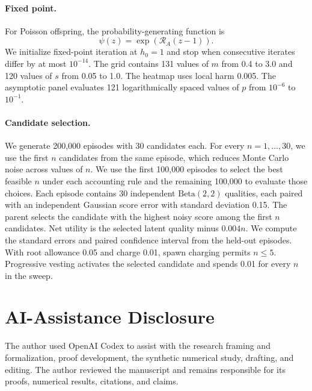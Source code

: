 \documentclass[sigconf,nonacm]{acmart}
\newcommand{\RA}{\mathcal{R}_{\!A}}
\begin{document}
\paragraph{Fixed point.}
For Poisson offspring, the probability-generating function is
\[
 \psi(z)=\exp(\RA(z-1)).
\]
We initialize fixed-point iteration at $h_0=1$ and stop when consecutive iterates differ by at
most $10^{-14}$.  The grid contains 131 values of $m$ from 0.4 to 3.0 and 120 values of $s$ from
0.05 to 1.0.  The heatmap uses local harm 0.005.  The asymptotic panel evaluates 121
logarithmically spaced values of $p$ from $10^{-6}$ to $10^{-1}$.

\paragraph{Candidate selection.}
We generate 200,000 episodes with 30 candidates each.  For every $n=1,\ldots,30$, we use the
first $n$ candidates from the same episode, which reduces Monte Carlo noise across values of
$n$.  We use the first 100,000 episodes to select the best feasible $n$ under each accounting
rule and the remaining 100,000 to evaluate those choices.  Each episode contains 30 independent
$\mathrm{Beta}(2,2)$ qualities, each paired with an independent Gaussian score error with standard
deviation 0.15.  The
parent selects the candidate with the highest noisy score among the first $n$ candidates.  Net
utility is the selected latent quality minus $0.004n$.  We compute the standard errors and paired
confidence interval from the held-out episodes.  With root allowance 0.05 and charge 0.01, spawn charging permits
$n\leq5$.  Progressive vesting activates the selected candidate and spends 0.01 for every $n$ in
the sweep.


\section*{AI-Assistance Disclosure}

The author used OpenAI Codex to assist with the research framing and formalization, proof
development, the synthetic numerical study, drafting, and editing.  The author reviewed the
manuscript and remains responsible for its proofs, numerical results, citations, and claims.

\balance


\end{document}
